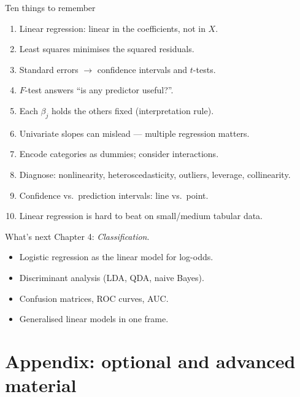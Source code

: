 \documentclass[aspectratio=169,11pt]{beamer}
\begin{document}
\begin{frame}{Ten things to remember}
  \begin{enumerate}
    \item Linear regression: linear in the coefficients, not in $X$.
    \item Least squares minimises the squared residuals.
    \item Standard errors $\to$ confidence intervals and $t$-tests.
    \item $F$-test answers ``is any predictor useful?''.
    \item Each $\beta_j$ holds the others fixed (interpretation rule).
    \item Univariate slopes can mislead --- multiple regression matters.
    \item Encode categories as dummies; consider interactions.
    \item Diagnose: nonlinearity, heteroscedasticity, outliers,
          leverage, collinearity.
    \item Confidence vs.\ prediction intervals: line vs.\ point.
    \item Linear regression is hard to beat on small/medium tabular
          data.
  \end{enumerate}
\end{frame}

\begin{frame}{What's next}
  Chapter 4: \emph{Classification}.
  \begin{itemize}
    \item Logistic regression as the linear model for log-odds.
    \item Discriminant analysis (LDA, QDA, naive Bayes).
    \item Confusion matrices, ROC curves, AUC.
    \item Generalised linear models in one frame.
  \end{itemize}
\end{frame}


\appendix
\AtBeginSection[]{}
\section{Appendix: optional and advanced material}
\end{document}
